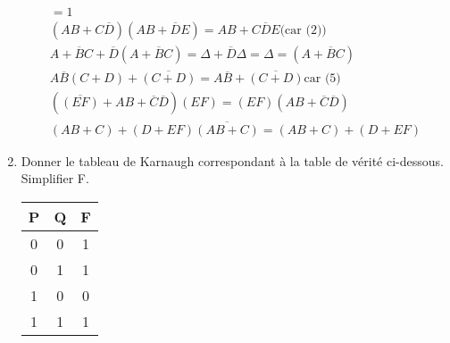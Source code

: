 \documentclass[a4paper,10pt]{exam}
\begin{document}
\begin{enumerate}
\begin{solution}
\begin{align*}
      = 1 \\
      (AB + C\overline{D})(AB + \overline{D}E) = AB + C\overline{D}E
      \textrm{(car (2))}\\
      A + \overline{B}C + \overline{D}(A+\overline{B}C) = \Delta +
      \overline{D}\Delta = \Delta = (A + \overline{B}C)\\
      A\overline{B}(C + D) + \overline{(C + D)} = A\overline{B} + \overline{(C +
        D)} \textrm{car (5)}\\
      (\overline{(EF)} + AB + \overline{C}\overline{D})(EF) = (EF)(AB +
      \overline{C}\overline{D})\\
      (AB + C) + (D + EF)\overline{(AB + C)} = (AB + C) + (D + EF)
  \end{align*}
  \end{solution}

\item Donner le tableau de Karnaugh correspondant à la table de vérité ci-dessous.
Simplifier F.
\begin{center}
\begin{tabular}{cc|c}
P&Q&F\\
\hline
0&0&1\\
0&1&1\\
1&0&0\\
1&1&1\\
\end{tabular}
\end{center}

\begin{solution}
  \begin{center}\end{center}


\end{solution}
\end{enumerate}
\end{document}
